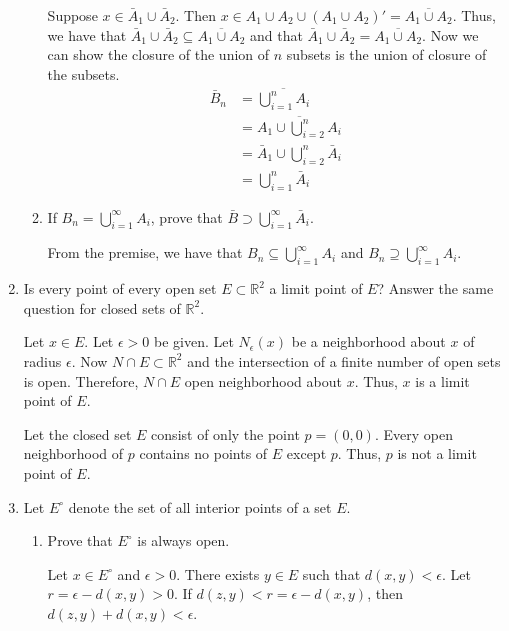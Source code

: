 \begin{enumerate}
\begin{enumerate}[label = (\alph*), ref = \theenumi{} (\alph*)]
    Suppose \(x\in\bar{A}_1\cup \bar{A}_2\).
    Then \(x\in A_1\cup A_2\cup (A_1\cup A_2)' = \overline{A_1\cup A_2}\).
    Thus, we have that
    \(\bar{A}_1\cup \bar{A}_2\subseteq\overline{A_1\cup A_2}\) and that
    \(\bar{A}_1\cup \bar{A}_2 = \overline{A_1\cup A_2}\).
    Now we can show the closure of the union of \(n\) subsets is the union of
    closure of the subsets.
    \begin{align*}
      \bar{B}_n & = \overline{\bigcup_{i = 1}^nA_i}\\
                & = \overline{A_1\cup\bigcup_{i = 2}^nA_i}\\
                & = \bar{A}_1\cup\bigcup_{i = 2}^n\bar{A}_i\\
                & = \bigcup_{i = 1}^n\bar{A}_i
    \end{align*}
  \item
    If \(B_n = \bigcup_{i = 1}^{\infty}A_i\), prove that
    \(\bar{B}\supset\bigcup_{i = 1}^{\infty}\bar{A}_i\).
    \par\smallskip
    From the premise, we have that \(B_n\subseteq\bigcup_{i = 1}^{\infty}A_i\)
    and \(B_n\supseteq\bigcup_{i = 1}^{\infty}A_i\).
  \end{enumerate}
\item
  Is every point of every open set \(E\subset\mathbb{R}^2\) a limit point of
  \(E\)?
  Answer the same question for closed sets of \(\mathbb{R}^2\).
  \par\smallskip
  Let \(x\in E\).
  Let \(\epsilon > 0\) be given.
  Let \(N_{\epsilon}(x)\) be a neighborhood about \(x\) of radius \(\epsilon\).
  Now \(N\cap E\subset\mathbb{R}^2\) and the intersection of a finite number of
  open sets is open.
  Therefore, \(N\cap E\) open neighborhood about \(x\).
  Thus, \(x\) is a limit point of \(E\).
  \par\smallskip
  Let the closed set \(E\) consist of only the point \(p = (0, 0)\).
  Every open neighborhood of \(p\) contains no points of \(E\) except \(p\).
  Thus, \(p\) is not a limit point of \(E\).
\item
  Let \(E^{\circ}\) denote the set of all interior points of a set \(E\).
  \begin{enumerate}[label = (\alph*)]
  \item
    Prove that \(E^{\circ}\) is always open.
    \par\smallskip
    Let \(x\in E^{\circ}\) and \(\epsilon > 0\).
    There exists \(y\in E\) such that \(d(x,y) < \epsilon\).
    Let \(r = \epsilon - d(x,y) > 0\).
    If \(d(z,y) < r = \epsilon - d(x,y)\), then \(d(z,y) + d(x,y) < \epsilon\).

\end{enumerate}
\end{enumerate}
